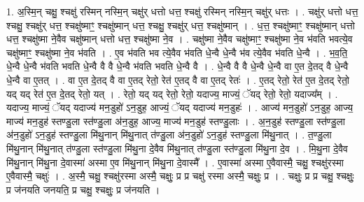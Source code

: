 \documentclass[17pt]{extarticle}
\begin{document}
1. अ॒स्मि॒न् चक्षु॒ श्चक्षु॑ रस्मिन् नस्मि॒न् चक्षु॑र् धत्तो धत्त॒ श्चक्षु॑ रस्मिन् नस्मि॒न् चक्षु॑र् धत्तः । . चक्षु॑र् धत्तो धत्त॒ श्चक्षु॒ श्चक्षु॑र् धत्त॒ श्चक्षु॑ष्माꣳ॒॒ श्चक्षु॑ष्मान् धत्त॒ श्चक्षु॒ श्चक्षु॑र् धत्त॒ श्चक्षु॑ष्मान् । . ध॒त्त॒ श्चक्षु॑ष्माꣳ॒॒ श्चक्षु॑ष्मान् धत्तो धत्त॒ श्चक्षु॑ष्मा ने॒वैव चक्षु॑ष्मान् धत्तो धत्त॒ श्चक्षु॑ष्मा ने॒व । . चक्षु॑ष्मा ने॒वैव चक्षु॑ष्माꣳ॒॒ श्चक्षु॑ष्मा ने॒व भ॑वति भवत्ये॒व चक्षु॑ष्माꣳ॒॒ श्चक्षु॑ष्मा ने॒व भ॑वति । . ए॒व भ॑वति भव त्ये॒वैव भ॑वति धे॒न्वै धे॒न्वै भ॑व त्ये॒वैव भ॑वति धे॒न्वै । . भ॒व॒ति॒ धे॒न्वै धे॒न्वै भ॑वति भवति धे॒न्वै वै वै धे॒न्वै भ॑वति भवति धे॒न्वै वै । . धे॒न्वै वै वै धे॒न्वै धे॒न्वै वा ए॒त दे॒तद् वै धे॒न्वै धे॒न्वै वा ए॒तत् । . वा ए॒त दे॒तद् वै वा ए॒तद् रेतो॒ रेत॑ ए॒तद् वै वा ए॒तद् रेतः॑ । . ए॒तद् रेतो॒ रेत॑ ए॒त दे॒तद् रेतो॒ यद् यद् रेत॑ ए॒त दे॒तद् रेतो॒ यत् । . रेतो॒ यद् यद् रेतो॒ रेतो॒ यदाज्य॒ माज्यं॒ ॅयद् रेतो॒ रेतो॒ यदाज्य᳚म् । . यदाज्य॒ माज्यं॒ ॅयद् यदाज्य॑ मन॒डुहो॑ ऽन॒डुह॒ आज्यं॒ ॅयद् यदाज्य॑ मन॒डुहः॑ । . आज्य॑ मन॒डुहो॑ ऽन॒डुह॒ आज्य॒ माज्य॑ मन॒डुह॑ स्तण्डु॒ला स्त॑ण्डु॒ला अ॑न॒डुह॒ आज्य॒ माज्य॑ मन॒डुह॑ स्तण्डु॒लाः । . अ॒न॒डुह॑ स्तण्डु॒ला स्त॑ण्डु॒ला अ॑न॒डुहो॑ ऽन॒डुह॑ स्तण्डु॒ला मि॑थु॒नान् मि॑थु॒नात् त॑ण्डु॒ला अ॑न॒डुहो॑ ऽन॒डुह॑ स्तण्डु॒ला मि॑थु॒नात् । . त॒ण्डु॒ला मि॑थु॒नान् मि॑थु॒नात् त॑ण्डु॒ला स्त॑ण्डु॒ला मि॑थु॒ना दे॒वैव मि॑थु॒नात् त॑ण्डु॒ला स्त॑ण्डु॒ला मि॑थु॒ना दे॒व । . मि॒थु॒ना दे॒वैव मि॑थु॒नान् मि॑थु॒ना दे॒वास्मा॑ अस्मा ए॒व मि॑थु॒नान् मि॑थु॒ना दे॒वास्मै᳚ । . ए॒वास्मा॑ अस्मा ए॒वैवास्मै॒ चक्षु॒ श्चक्षु॑रस्मा ए॒वैवास्मै॒ चक्षुः॑ । . अ॒स्मै॒ चक्षु॒ श्चक्षु॑रस्मा अस्मै॒ चक्षुः॒ प्र प्र चक्षु॑ रस्मा अस्मै॒ चक्षुः॒ प्र । . चक्षुः॒ प्र प्र चक्षु॒ श्चक्षुः॒ प्र ज॑नयति जनयति॒ प्र चक्षु॒ श्चक्षुः॒ प्र ज॑नयति । \newline
\end{document}
